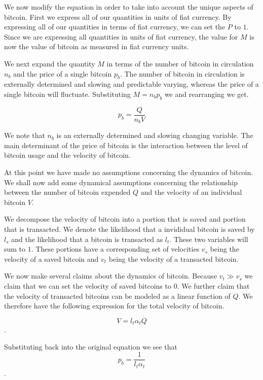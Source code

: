 We now modify the equation in order to take into account the unique
aspects of bitcoin.  First we express all of our quantities in units
of fiat currency.  By expressing all of our quantities in terms of
fiat currency, we can set the $P$ to $1$.  Since we are expressing all
quantities in units of fiat currency, the value for $M$ is now the
value of bitcoin as measured in fiat currency units.

We next expand the quantity $M$ in terms of the number of bitcoin in
circulation $n_b$ and the price of a single bitcoin $p_b$.  The number
of bitcoin in circulation is externally determined and slowing and
predictable varying, whereas the price of a single bitcoin will
fluctuate.  Substituting $M=n_b p_b$ we and rearranging we get.

\begin{equation}
p_b = \frac{Q}{n_b V}
\end{equation}

We note that $n_b$ is an externally determined and slowing changing
variable.  The main determinant of the price of bitcoin is the
interaction between the level of bitcoin usage and the velocity of
bitcoin.

At this point we have made no assumptions concerning the dynamics of
bitcoin.  We shall now add some dynamical assumptions concerning the
relationship between the number of bitcoin expended $Q$ and the
velocity of an individual bitcoin $V$.

We decompose the velocity of bitcoin into a portion that is saved and
portion that is transacted.  We denote the likelihood that a
invididual bitcoin is saved by $l_s$ and the likelihood that a bitcoin
is transacted as $l_t$.  These two variables will sum to $1$.  These
portions have a corresponding set of velocities $v_s$ being the
velocity of a saved bitcoin and $v_t$ being the velocity of a
transacted bitcoin.

We now make several claims about the dynamics of bitcoin.  Because
$v_t \gg v_s$ we claim that we can set the velocity of saved bitcoins
to $0$.  We further claim that the velocity of transacted bitcoins can
be modeled as a linear function of $Q$.  We therefore have the
following expression for the total velocity of bitcoin.

\begin{equation}
V = l_t\alpha_t Q
\end{equation}.

Substituting back into the original equation we see that
\begin{equation}
p_b = \frac{1}{l_t \alpha_t}
\end{equation}.

